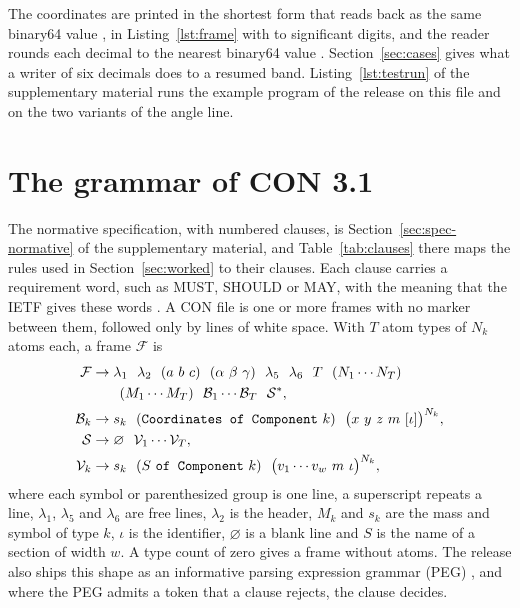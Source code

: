 \documentclass[preprint,12pt]{elsarticle}
\begin{document}
The coordinates are printed in the shortest form that reads back as the same binary64 value \cite{steeleHowPrintFloatingpoint1990,adamsRyFastFloattostring2018}, in Listing~\ref{lst:frame} with \wkDigitsMin{} to \wkDigitsMax{} significant digits, and the reader rounds each decimal to the nearest binary64 value \cite{clingerHowReadFloating1990,lemireNumberParsingGigabytes2021}.
Section~\ref{sec:cases} gives what a writer of six decimals does to a resumed band.
Listing~\ref*{lst:testrun} of the supplementary material runs the example program of the release on this file and on the two variants of the angle line.

\section{The grammar of CON 3.1}\label{sec:format} The normative specification, with \clauseTotal{} numbered clauses, is Section~\ref*{sec:spec-normative} of the supplementary material, and Table~\ref*{tab:clauses} there maps the rules used in Section~\ref{sec:worked} to their clauses.
Each clause carries a requirement word, such as MUST, SHOULD or MAY, with the meaning that the IETF gives these words \cite{bradnerKeyWordsUse1997}.
A CON file is one or more frames with no marker between them, followed only by lines of white space.
With \(T\) atom types of \(N_k\) atoms each, a frame \(\mathcal{F}\) is
\begin{equation}
\label{eq:frame}
\begin{aligned}
\mathcal{F}&\to \lambda_1\ \ \lambda_2\ \ (a\ b\ c)\ \ (\alpha\ \beta\ \gamma)\ \ \lambda_5\ \ \lambda_6\ \ T\ \ (N_1\cdots N_T)\\
&\qquad (M_1\cdots M_T)\ \ \mathcal{B}_1\cdots\mathcal{B}_T\ \ \mathcal{S}^{*},\\
\mathcal{B}_k&\to s_k\ \ (\text{\texttt{Coordinates of Component}}\ k)\ \ \bigl(x\ y\ z\ m\ [\iota]\bigr)^{N_k},\\
\mathcal{S}&\to \varnothing\ \ \mathcal{V}_1\cdots\mathcal{V}_T,\\
\mathcal{V}_k&\to s_k\ \ (S\ \text{\texttt{of Component}}\ k)\ \ \bigl(v_1\cdots v_w\ m\ \iota\bigr)^{N_k},
\end{aligned}
\end{equation}
where each symbol or parenthesized group is one line, a superscript repeats a line, \(\lambda_1\), \(\lambda_5\) and \(\lambda_6\) are free lines, \(\lambda_2\) is the header, \(M_k\) and \(s_k\) are the mass and symbol of type \(k\), \(\iota\) is the identifier, \(\varnothing\) is a blank line and \(S\) is the name of a section of width \(w\).
A type count of zero gives a frame without atoms.
The release also ships this shape as an informative parsing expression grammar (PEG) \cite{fordParsingExpressionGrammars2004}, and where the PEG admits a token that a clause rejects, the clause decides.
\end{document}
